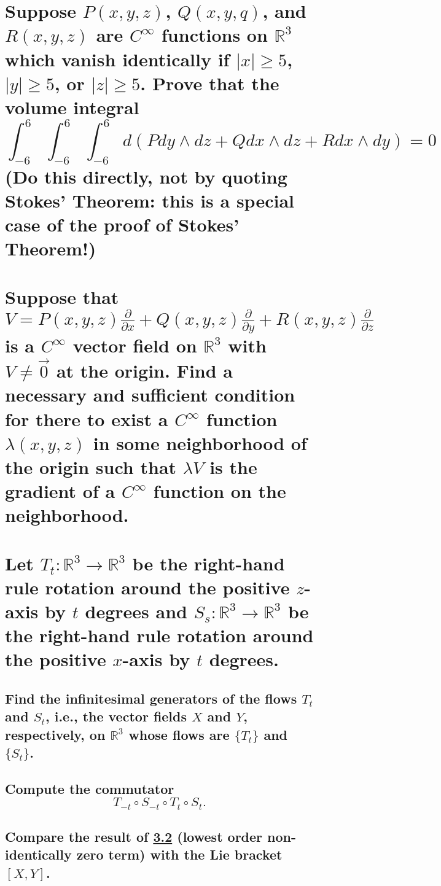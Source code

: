 \documentclass[10pt]{article}
\newcommand{\R}{\ensuremath{\mathbb{R}}} \newcommand{\RP}{\ensuremath{\mathbb{RP}}}
\newcommand{\del}{\ensuremath{\partial}} \newcommand{\rank}{\ensuremath{\mathrm{rank}}}
\begin{document}
 

\section{Suppose $P(x,y,z)$, $Q(x,y,q)$, and $R(x,y,z)$ are $C^\infty$ functions on $\R^3$ which
  vanish identically if $|x| \geq 5$, $|y| \geq 5$, or $|z| \geq 5$. Prove that the volume
  integral
$$\int_{-6}^6 \int_{-6}^6 \int_{-6}^6 d(P dy \wedge dz + Q dx \wedge dz + R dx \wedge
dy) =0$$ (Do this directly, not by quoting Stokes' Theorem: this is a special case of the proof of
Stokes' Theorem!)  }

\section{Suppose that $V = P(x,y,z) \frac{\del}{\del x} + Q(x,y,z) \frac{\del}{\del y} + R(x,y,z)
  \frac{\del}{\del z} $ is a $C^{\infty} $ vector field on $\R^{3}$ with $V \not= \vec{0}$ at the
  origin. Find a necessary and sufficient condition for there to exist a $C^{\infty} $ function
  $\lambda(x,y,z) $ in some neighborhood of the origin such that $\lambda V$ is the gradient of a
  $C^{\infty}$ function on the neighborhood.  }

\section{Let $T_t : \R^3 \to \R^3$ be the right-hand rule rotation around the positive $z$-axis by
  $t$ degrees and $S_s : \R^3 \to \R^3 $ be the right-hand rule rotation around the positive
  $x$-axis by $t$ degrees.}

\subsection{Find the infinitesimal generators of the flows $T_t$ and $S_t$, i.e., the vector fields
$X$ and $Y$, respectively, on $\R^3$ whose flows are $\{T_t\} $ and $\{ S_t\}$.}

\subsection{Compute the commutator $$T_{-t}\circ S_{-t}\circ T_t\circ S_t .$$}
\label{comm}

\subsection{Compare the result of \ref{comm} (lowest order non-identically zero term) with the Lie bracket
$[X,Y]$.}
\end{document}
